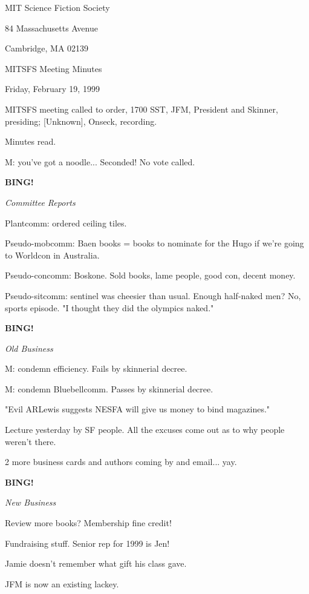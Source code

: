 \documentclass[12pt]{article}
\newcommand{\bing}{{\bf BING!} }
\newcommand{\goto}[1]{\bing \vskip 12pt \centerline{{\em{#1}}}}
\begin{document}
\begin{center}

MIT Science Fiction Society 

84 Massachusetts Avenue

Cambridge, MA 02139

\vspace{12pt}

MITSFS Meeting Minutes 

Friday, February 19, 1999

\end{center}
 
\vspace{18pt}

\setlength{\parskip}{6pt}

\noindent
MITSFS meeting called to order, 1700 SST,
JFM, President and Skinner, presiding; [Unknown], Onseck, recording.

Minutes read.

M: you've got a noodle... Seconded! No vote called.

\goto{Committee Reports}

Plantcomm: ordered ceiling tiles.

Pseudo-mobcomm: Baen books = books to nominate for the Hugo if we're going to Worldcon in Australia.

Pseudo-concomm: Boskone. Sold books, lame people, good con, decent money.

Pseudo-sitcomm: sentinel was cheesier than usual. Enough half-naked men? No, sports episode. "I thought they did the olympics naked."

\goto{Old Business}

M: condemn efficiency. Fails by skinnerial decree.

M: condemn Bluebellcomm. Passes by skinnerial decree.

"Evil ARLewis suggests NESFA will give us money to bind magazines."

Lecture yesterday by SF people. All the excuses come out as to why people weren't there.

2 more business cards and authors coming by and email... yay.

\goto{New Business}

Review more books? Membership fine credit!

Fundraising stuff. Senior rep for 1999 is Jen!

Jamie doesn't remember what gift his class gave.

JFM is now an existing lackey.
\end{document}
